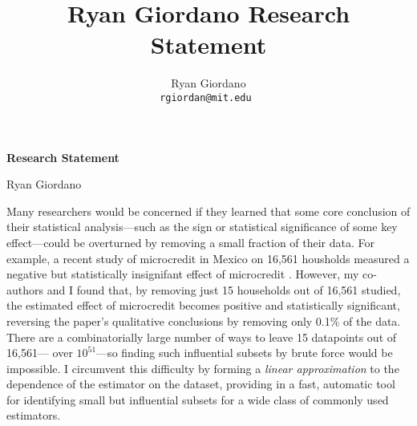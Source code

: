 
\usepackage{enumitem}

\usepackage{geometry}
\geometry{top=0.8in}
\geometry{left=1.1in}
\geometry{right=1.1in}

\title{Ryan Giordano Research Statement}

\author{
  Ryan Giordano \\ \texttt{rgiordan@mit.edu }
}



\begin{minipage}[t]{0.5\textwidth}
\hspace{-2em} %
{\bf \LARGE Research Statement}\\
\end{minipage}
\begin{minipage}[t]{0.5\textwidth}
        \hspace{8em} %
        {\LARGE Ryan Giordano}
\end{minipage}

Many researchers would be concerned if they learned that some core conclusion of
their statistical analysis---such as the sign or statistical significance of
some key effect---could be overturned by removing a small fraction of their
data.
For example, a recent study of microcredit in Mexico on 16,561 housholds
measured a negative but statistically insignifant effect of microcredit
\citep{angelucci:2015:microcredit}.  However, my co-authors and I found that, by
removing just 15 households out of 16,561 studied, the estimated effect of
microcredit becomes positive and statistically significant, reversing the
paper's qualitative conclusions by removing only 0.1\% of the data.  There are a
combinatorially large number of ways to leave 15 datapoints out of 16,561---
over $10^{51}$---so finding such influential subsets by brute force would be
impossible.  I circumvent this difficulty by forming a \emph{linear
approximation} to the dependence of the estimator on the dataset, providing in a
fast, automatic tool for identifying small but influential subsets for a wide
class of commonly used estimators.

